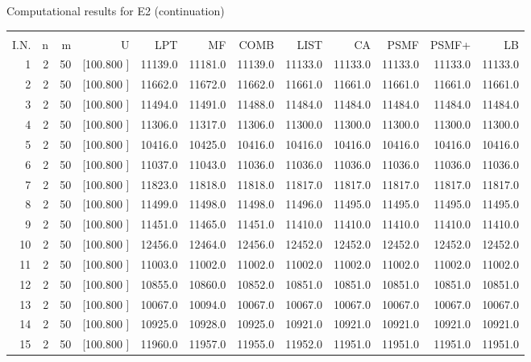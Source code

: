 \documentclass[12pt,a4paper]{article}
\begin{document}
\begin{center}
 Computational results for E2 (continuation) {\tiny
\begin{tabular}{r r r r r r r r r r r r}\hline
    &   &   &          &        &        &        &        &        &        &        &       \\[-0.1in]
  I.N.  &  n  &  m  &  U  &  LPT  &  MF  &  COMB  &  LIST  &  CA  & PSMF &PSMF+ & LB \\[0.03in]
\hline
   1&  2& 50&[100.800   ]& 11139.0& 11181.0& 11139.0& 11133.0& 11133.0& 11133.0& 11133.0& 11133.0\\[-0.02in]
   2&  2& 50&[100.800   ]& 11662.0& 11672.0& 11662.0& 11661.0& 11661.0& 11661.0& 11661.0& 11661.0\\[-0.02in]
   3&  2& 50&[100.800   ]& 11494.0& 11491.0& 11488.0& 11484.0& 11484.0& 11484.0& 11484.0& 11484.0\\[-0.02in]
   4&  2& 50&[100.800   ]& 11306.0& 11317.0& 11306.0& 11300.0& 11300.0& 11300.0& 11300.0& 11300.0\\[-0.02in]
   5&  2& 50&[100.800   ]& 10416.0& 10425.0& 10416.0& 10416.0& 10416.0& 10416.0& 10416.0& 10416.0\\[-0.02in]
   6&  2& 50&[100.800   ]& 11037.0& 11043.0& 11036.0& 11036.0& 11036.0& 11036.0& 11036.0& 11036.0\\[-0.02in]
   7&  2& 50&[100.800   ]& 11823.0& 11818.0& 11818.0& 11817.0& 11817.0& 11817.0& 11817.0& 11817.0\\[-0.02in]
   8&  2& 50&[100.800   ]& 11499.0& 11498.0& 11498.0& 11496.0& 11495.0& 11495.0& 11495.0& 11495.0\\[-0.02in]
   9&  2& 50&[100.800   ]& 11451.0& 11465.0& 11451.0& 11410.0& 11410.0& 11410.0& 11410.0& 11410.0\\[-0.02in]
  10&  2& 50&[100.800   ]& 12456.0& 12464.0& 12456.0& 12452.0& 12452.0& 12452.0& 12452.0& 12452.0\\[-0.02in]
  11&  2& 50&[100.800   ]& 11003.0& 11002.0& 11002.0& 11002.0& 11002.0& 11002.0& 11002.0& 11002.0\\[-0.02in]
  12&  2& 50&[100.800   ]& 10855.0& 10860.0& 10852.0& 10851.0& 10851.0& 10851.0& 10851.0& 10851.0\\[-0.02in]
  13&  2& 50&[100.800   ]& 10067.0& 10094.0& 10067.0& 10067.0& 10067.0& 10067.0& 10067.0& 10067.0\\[-0.02in]
  14&  2& 50&[100.800   ]& 10925.0& 10928.0& 10925.0& 10921.0& 10921.0& 10921.0& 10921.0& 10921.0\\[-0.02in]
  15&  2& 50&[100.800   ]& 11960.0& 11957.0& 11955.0& 11952.0& 11951.0& 11951.0& 11951.0& 11951.0\\[-0.02in]

\end{tabular}}
\end{center}
\end{document}
